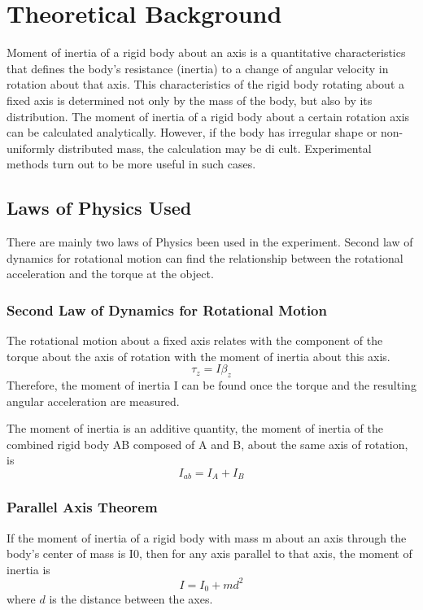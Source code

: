 \documentclass[12pt,a4paper]{article}
\begin{document}


\doublespacing 
\newpage

\section{Theoretical Background}

Moment of inertia of a rigid body about an axis is a quantitative
characteristics that defines the body’s resistance (inertia) to a change of
angular velocity in rotation about that axis. 
This characteristics of the rigid body rotating about a fixed axis is determined
not only by the mass of the body, but also by its distribution. 
The moment of inertia of a rigid body about a certain rotation axis can be
calculated analytically. 
However, if the body has irregular shape or non-uniformly distributed mass, the
calculation may be di cult.
Experimental methods turn out to be more useful in such cases.

\subsection{Laws of Physics Used}

There are mainly two laws of Physics been used in the experiment. Second law of
dynamics for rotational motion can find the relationship between the rotational
acceleration and the torque at the object.

\subsubsection{Second Law of Dynamics for Rotational Motion}

The rotational motion about a fixed axis relates with the component of the
torque about the axis of rotation with the moment of inertia about this axis.
$$ \tau_z = I\beta_z$$
Therefore, the moment of inertia I can be found once the torque and the
resulting angular acceleration are measured.

The moment of inertia is an additive quantity, the moment of inertia of the
combined rigid body AB composed of A and B, about the same axis of rotation, is 
$$ I_{ab} = I_A + I_B $$


\subsubsection{Parallel Axis Theorem}
If the moment of inertia of a rigid body with mass m about an axis through the
body’s center of mass is I0, then for any axis parallel to that axis, the moment
of inertia is
$$ I = I_0 + md^2 $$
where $d$ is the distance between the axes.
\end{document}

